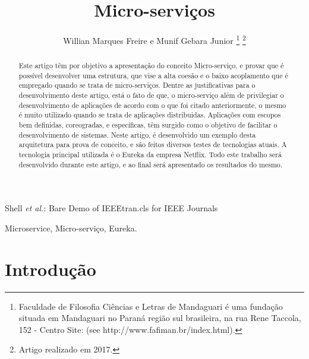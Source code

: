 \documentclass[journal]{IEEEtran}
\begin{document}
\title{Micro-serviços}

\author{Willian Marques Freire e
        Munif Gebara Junior%
\thanks{Faculdade de Filosofia Ciências e Letras de Mandaguari é uma fundação
situada em Mandaguari no Paraná região sul brasileira,
na rua Rene Taccola, 152 - Centro Site: (see http://www.fafiman.br/index.html).}%
\thanks{Artigo realizado em 2017.}}

%
{Shell \MakeLowercase{\textit{et al.}}: Bare Demo of IEEEtran.cls for IEEE Journals}

\maketitle

\begin{abstract}
Este artigo têm por objetivo a apresentação do conceito Micro-serviço, e provar que é possível desenvolver uma estrutura, que vise a alta coesão e o baixo acoplamento que é empregado quando se trata de micro-serviços. Dentre as justificativas para o desenvolvimento deste artigo, está o fato de que, o micro-serviço além de privilegiar o desenvolvimento de aplicações de acordo com o que foi citado anteriormente, o mesmo é muito utilizado quando se trata de aplicações distribuidas. Aplicações com escopos bem definidas, coreogradas, e específicas, têm surgido como o objetivo de facilitar o desenvolvimento de sistemas. Neste artigo, é desenvolvido um exemplo desta arquitetura para prova de conceito, e são feitos diversos testes de tecnologias atuais. A tecnologia principal utilizada é o Eureka da empresa Netflix. Todo este trabalho será desenvolvido durante este artigo, e ao final será apresentado os resultados do mesmo.  
\end{abstract}

\begin{IEEEkeywords}
Microservice, Micro-serviço, Eureka.
\end{IEEEkeywords}


\IEEEpeerreviewmaketitle

\section{Introdução}
\end{document}
